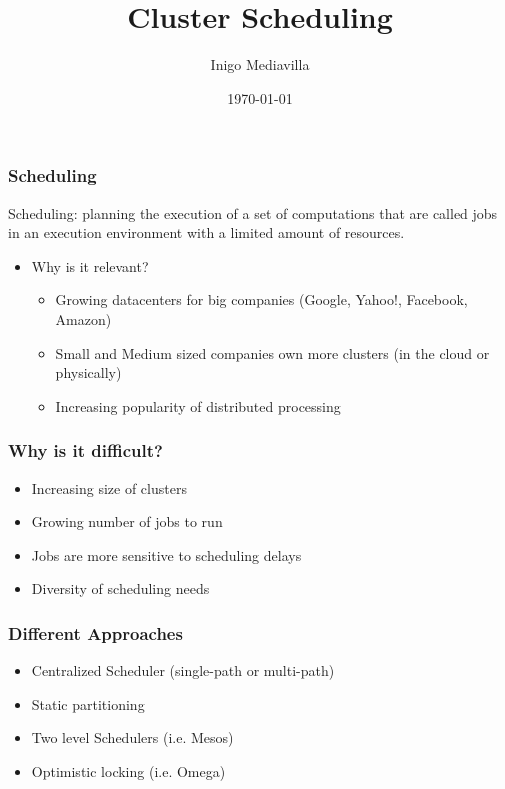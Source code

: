 \documentclass[notes]{beamer}
\title{Cluster Scheduling}
\author{Inigo Mediavilla}
\date\today
\begin{document}
  \begin{frame}
  \titlepage
  \end{frame}
  
  \note{}

  \begin{frame}
    \frametitle{Scheduling}
    \begin{definition}{Scheduling:}
    planning the execution of a set of computations that
    are called jobs in an execution environment with a limited amount
    of resources.
    \end{definition}
    \begin{itemize}
      \item Why is it relevant?
      \begin{itemize}
        \item Growing datacenters for big companies (Google, Yahoo!,
          Facebook, Amazon)
        \item Small and Medium sized companies own more clusters (in
          the cloud or physically)  
        \item Increasing popularity of distributed processing
      \end{itemize}
    \end{itemize}
  \end{frame}

  \note{}

  \begin{frame}
    \frametitle{Why is it difficult?}
    \begin{itemize}
      \item Increasing size of clusters
      \item Growing number of jobs to run
      \item Jobs are more sensitive to scheduling delays
      \item Diversity of scheduling needs
    \end{itemize}
  \end{frame}

  \note{}

  \begin{frame}
    \frametitle{Different Approaches}
    \begin{itemize}
      \item Centralized Scheduler (single-path or multi-path)
      \item Static partitioning
      \item Two level Schedulers (i.e. Mesos)
      \item Optimistic locking (i.e. Omega)
    \end{itemize}
  \end{frame}
\end{document}
